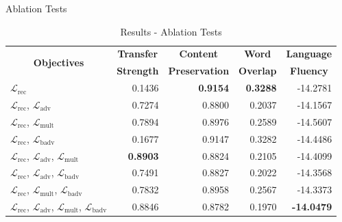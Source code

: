 \documentclass[aspectratio=169]{beamer}
\newcommand{\loss}[1]{\mathcal{L}_{\text{#1}}}
\newcommand{\tabh}[1]{\multicolumn{1}{c|}{\textbf{#1}}}
\newcommand{\tabc}[2]{\multicolumn{1}{|c|}{\multirow{#1}{*}{\textbf{#2}}}}
\begin{document}
\begin{frame}{Ablation Tests}
	\begin{table}[ht]
		\centering
		\begin{tabular}{| l | r | r | r | r |}
			\hline
			\tabc{2}{Objectives}                                     & \tabh{Transfer} & \tabh{Content}      & \tabh{Word}     & \tabh{Language}   \\
			                                                         & \tabh{Strength} & \tabh{Preservation} & \tabh{Overlap}  & \tabh{Fluency}    \\
			\hline
			\hline
			$\loss{rec}$                                             & 0.1436          & \textbf{0.9154}     & \textbf{0.3288} & -14.2781          \\
			\hline
			$\loss{rec}$, $\loss{adv}$                               & 0.7274          & 0.8800              & 0.2037          & -14.1567          \\
			\hline
			$\loss{rec}$, $\loss{mult}$                              & 0.7894          & 0.8976              & 0.2589          & -14.5607          \\
			\hline
			$\loss{rec}$, $\loss{badv}$                              & 0.1677          & 0.9147              & 0.3282          & -14.4486          \\
			\hline
			$\loss{rec}$, $\loss{adv}$, $\loss{mult}$                & \textbf{0.8903} & 0.8824              & 0.2105          & -14.4099          \\
			\hline
			$\loss{rec}$, $\loss{adv}$, $\loss{badv}$                & 0.7491          & 0.8827              & 0.2022          & -14.3568          \\
			\hline
			$\loss{rec}$, $\loss{mult}$, $\loss{badv}$               & 0.7832          & 0.8958              & 0.2567          & -14.3373          \\
			\hline
			$\loss{rec}$, $\loss{adv}$, $\loss{mult}$, $\loss{badv}$ & 0.8846          & 0.8782              & 0.1970          & \textbf{-14.0479} \\
			\hline
		\end{tabular}
		\caption{Results - Ablation Tests}
		\label{tab:ablation-results}
	\end{table}
\end{frame}
\end{document}
